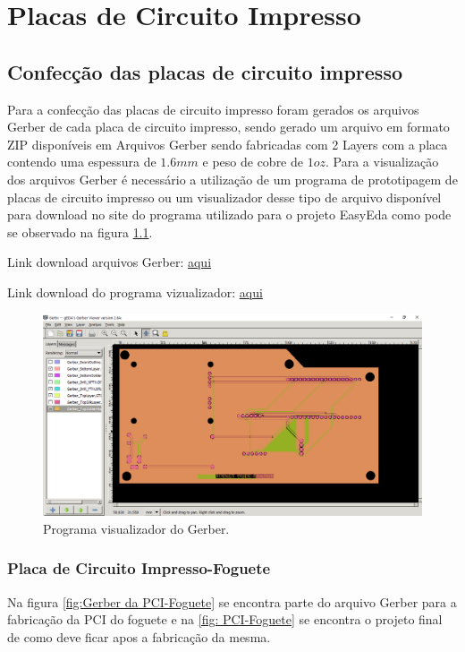 \chapter{Placas de Circuito Impresso}

\section{Confecção das placas de circuito impresso}

\par Para a confecção das placas de circuito impresso foram gerados os arquivos Gerber de cada placa de circuito impresso, sendo gerado um arquivo em formato ZIP disponíveis em Arquivos Gerber sendo fabricadas com 2 Layers com a placa contendo uma espessura de $1.6 mm$ e peso de cobre de $1 oz$. Para a visualização dos arquivos Gerber é necessário a utilização de um programa de prototipagem de placas de circuito impresso ou um visualizador desse tipo de arquivo disponível para download no site do programa utilizado para o projeto EasyEda como pode se observado na figura \ref{fig:Gerber}.
\par Link download arquivos Gerber: \href {https://drive.google.com/drive/folders/1P1pQGE_zuSLOB5qd8zfESWqLDwtyoRKd?usp=sharing}{aqui}
\par Link download do programa vizualizador: \href{https://sourceforge.net/projects/gerbv/files/}{aqui} 

\begin{figure}[H]
  \centering
  \includegraphics[scale=0.3]{Figuras/pci fabric/imagem de fabicação.png}
  \caption{Programa visualizador do Gerber.}
  \label{fig:Gerber}
\end{figure}

\subsection{Placa de Circuito Impresso-Foguete}
\par Na figura \ref{fig:Gerber da PCI-Foguete} se encontra parte do arquivo Gerber para a fabricação da PCI do foguete e na \ref{fig: PCI-Foguete} se encontra o projeto final de como deve ficar apos a fabricação da mesma.

